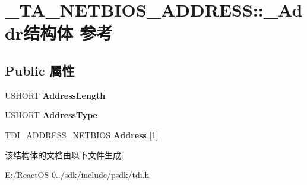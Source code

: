 \hypertarget{struct___t_a___n_e_t_b_i_o_s___a_d_d_r_e_s_s_1_1___addr}{}\section{\+\_\+\+T\+A\+\_\+\+N\+E\+T\+B\+I\+O\+S\+\_\+\+A\+D\+D\+R\+E\+SS\+:\+:\+\_\+\+Addr结构体 参考}
\label{struct___t_a___n_e_t_b_i_o_s___a_d_d_r_e_s_s_1_1___addr}
\subsection*{Public 属性}
\begin{DoxyCompactItemize}
\item 
\mbox{\label{struct___t_a___n_e_t_b_i_o_s___a_d_d_r_e_s_s_1_1___addr_a7b2bb8a0fc7d518f055d6ac945a2090d}} 
U\+S\+H\+O\+RT {\bfseries Address\+Length}
\item 
\mbox{\label{struct___t_a___n_e_t_b_i_o_s___a_d_d_r_e_s_s_1_1___addr_a7edbcc050264c2d3540c327b33bbfe28}} 
U\+S\+H\+O\+RT {\bfseries Address\+Type}
\item 
\mbox{\label{struct___t_a___n_e_t_b_i_o_s___a_d_d_r_e_s_s_1_1___addr_af71be75b1a44d33ee6bdc73766893332}} 
\hyperlink{struct___t_d_i___a_d_d_r_e_s_s___n_e_t_b_i_o_s}{T\+D\+I\+\_\+\+A\+D\+D\+R\+E\+S\+S\+\_\+\+N\+E\+T\+B\+I\+OS} {\bfseries Address} \mbox{[}1\mbox{]}
\end{DoxyCompactItemize}


该结构体的文档由以下文件生成\+:\begin{DoxyCompactItemize}
\item 
E\+:/\+React\+O\+S-\/0../sdk/include/psdk/tdi.\+h\end{DoxyCompactItemize}
